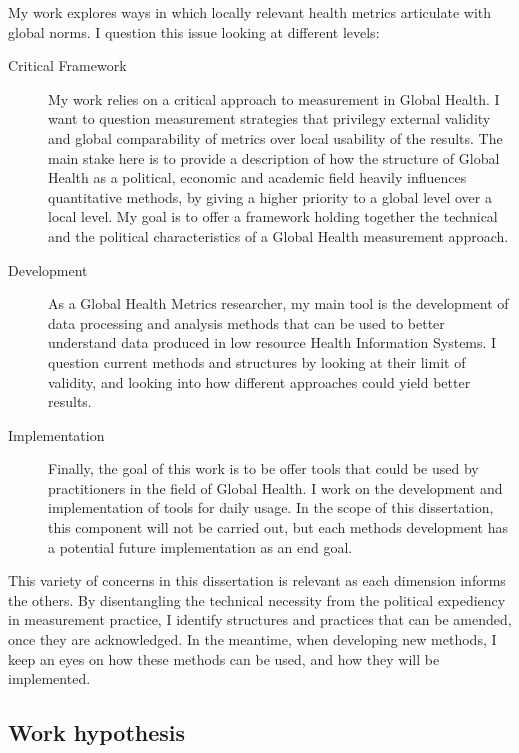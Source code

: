 My work explores ways in which locally relevant health metrics articulate with global norms. I question this issue looking at different levels:

\begin{description}
\item[Critical Framework] My work relies on a critical approach to measurement in Global Health. I want to question measurement strategies that privilegy external validity and global comparability of metrics over local usability of the results. The main stake here is to provide a description of how the structure of Global Health as a political, economic and academic field heavily influences quantitative methods, by giving a higher priority to a global level over a local level. My goal is to offer a framework holding together the technical and the political characteristics of a Global Health measurement approach.
\item[Development] As a Global Health Metrics researcher, my main tool is the development of data processing and analysis methods that can be used to better understand data produced in low resource Health Information Systems. I question current methods and structures by looking at their limit of validity, and looking into how different approaches could yield better results.
\item[Implementation] Finally, the goal of this work is to be offer tools that could be used by practitioners in the field of Global Health. I work on the development and implementation of tools for daily usage. In the scope of this dissertation, this component will not be carried out, but each methods development has a potential future implementation as an end goal.
\end{description}

This variety of concerns in this dissertation is relevant as each dimension informs the others. By disentangling the technical necessity from the political expediency in measurement practice, I identify structures and practices that can be amended, once they are acknowledged. In the meantime, when developing new methods, I keep an eyes on how these methods can be used, and how they will be implemented.


\subsection{Work hypothesis}

